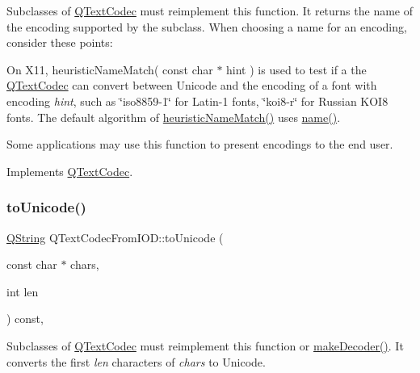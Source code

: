Subclasses of \mbox{\hyperlink{class_q_text_codec}{Q\+Text\+Codec}} must reimplement this function. It returns the name of the encoding supported by the subclass. When choosing a name for an encoding, consider these points\+: 
\begin{DoxyItemize}
\item On X11, heuristic\+Name\+Match( const char $\ast$ hint ) is used to test if a the \mbox{\hyperlink{class_q_text_codec}{Q\+Text\+Codec}} can convert between Unicode and the encoding of a font with encoding {\itshape hint}, such as \char`\"{}iso8859-\/1\char`\"{} for Latin-\/1 fonts, \char`\"{}koi8-\/r\char`\"{} for Russian K\+O\+I8 fonts. The default algorithm of \mbox{\hyperlink{class_q_text_codec_from_i_o_d_af7109ff23e3f6c34228eb046578c0357}{heuristic\+Name\+Match()}} uses \mbox{\hyperlink{class_q_text_codec_from_i_o_d_ac80023588673bad8a8b0d6983832c884}{name()}}. 
\item Some applications may use this function to present encodings to the end user. 
\end{DoxyItemize}

Implements \mbox{\hyperlink{class_q_text_codec_a5b735ce19dc6b0fb0e8858bd3f54f0e2}{Q\+Text\+Codec}}.

\mbox{\label{class_q_text_codec_from_i_o_d_af43c97a602cfb4e7d8d74d7a93925f48}} 
\subsubsection{\texorpdfstring{toUnicode()}{toUnicode()}}
{\footnotesize\ttfamily \mbox{\hyperlink{class_q_string}{Q\+String}} Q\+Text\+Codec\+From\+I\+O\+D\+::to\+Unicode (\begin{DoxyParamCaption}\item[{const char $\ast$}]{chars,  }\item[{int}]{len }\end{DoxyParamCaption}) const\hspace{0.3cm}{\ttfamily [inline]}, {\ttfamily [virtual]}}

Subclasses of \mbox{\hyperlink{class_q_text_codec}{Q\+Text\+Codec}} must reimplement this function or \mbox{\hyperlink{class_q_text_codec_from_i_o_d_ae5184561209ee0771ad28d3888a2a89c}{make\+Decoder()}}. It converts the first {\itshape len} characters of {\itshape chars} to Unicode.

